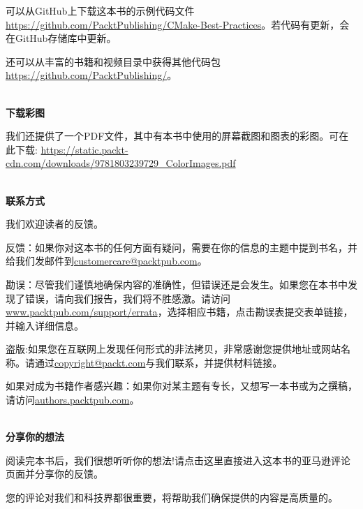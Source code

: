 可以从GitHub上下载这本书的示例代码文件\url{https://github.com/PacktPublishing/CMake-Best-Practices}。若代码有更新，会在GitHub存储库中更新。

还可以从丰富的书籍和视频目录中获得其他代码包\url{https://github.com/PacktPublishing/}。

\hspace*{\fill} \\ %
\textbf{下载彩图}

我们还提供了一个PDF文件，其中有本书中使用的屏幕截图和图表的彩图。可在此下载: \url{https://static.packt-cdn.com/downloads/9781803239729_ColorImages.pdf}

\hspace*{\fill} \\ %
\textbf{联系方式}

我们欢迎读者的反馈。

反馈：如果你对这本书的任何方面有疑问，需要在你的信息的主题中提到书名，并给我们发邮件到\url{customercare@packtpub.com}。

勘误：尽管我们谨慎地确保内容的准确性，但错误还是会发生。如果您在本书中发现了错误，请向我们报告，我们将不胜感激。请访问\url{www.packtpub.com/support/errata}，选择相应书籍，点击勘误表提交表单链接，并输入详细信息。

盗版:如果您在互联网上发现任何形式的非法拷贝，非常感谢您提供地址或网站名称。请通过\url{copyright@packt.com}与我们联系，并提供材料链接。

如果对成为书籍作者感兴趣：如果你对某主题有专长，又想写一本书或为之撰稿，请访问\url{authors.packtpub.com}。

\hspace*{\fill} \\ %
\textbf{分享你的想法}

阅读完本书后，我们很想听听你的想法!请点击这里直接进入这本书的亚马逊评论页面并分享你的反馈。

您的评论对我们和科技界都很重要，将帮助我们确保提供的内容是高质量的。

\newpage






















